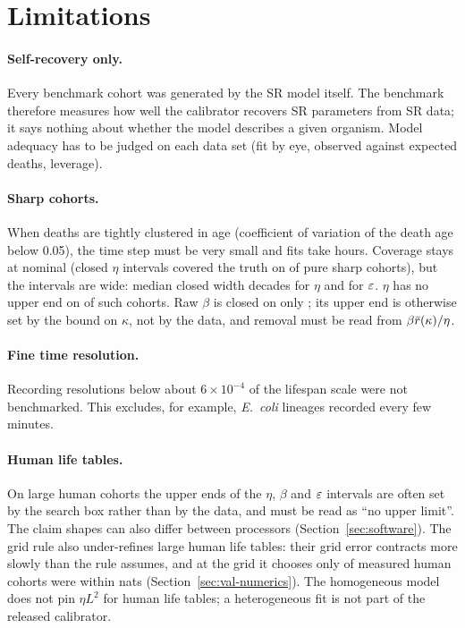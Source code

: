 \section{Limitations}\label{sec:limitations}

\paragraph{Self-recovery only.} Every benchmark cohort was generated by the SR model itself. The benchmark therefore
measures how well the calibrator recovers SR parameters from SR data; it says nothing about whether the model describes
a given organism. Model adequacy has to be judged on each data set (fit by eye, observed against expected deaths,
leverage).

\paragraph{Sharp cohorts.} When deaths are tightly clustered in age (coefficient of variation of the death age below
0.05), the time step must be very small and fits take hours. Coverage stays at nominal (closed $\eta$ intervals covered
the truth on  of  pure sharp cohorts), but the intervals are wide: median closed
width  decades for $\eta$ and  for $\varepsilon$. $\eta$ has no upper end on
 of  such cohorts. Raw $\beta$ is closed on only ; its upper end is
otherwise set by the bound on $\kappa$, not by the data, and removal must be read from $\beta\bar r(\kappa)/\eta$.

\paragraph{Fine time resolution.} Recording resolutions below about $6\times10^{-4}$ of the lifespan scale were not
benchmarked. This excludes, for example, \emph{E.~coli} lineages recorded every few minutes.

\paragraph{Human life tables.} On large human cohorts the upper ends of the $\eta$, $\beta$ and $\varepsilon$ intervals are often
set by the search box rather than by the data, and must be read as ``no upper limit''. The claim shapes can also differ
between processors (Section~\ref{sec:software}). The grid rule also under-refines large human life tables: their grid error contracts more slowly than the rule assumes,
and at the grid it chooses only  of  measured human cohorts were within
 nats (Section~\ref{sec:val-numerics}). The homogeneous model does not pin $\eta L^2$ for human life tables;
a heterogeneous fit is not part of the released calibrator.

